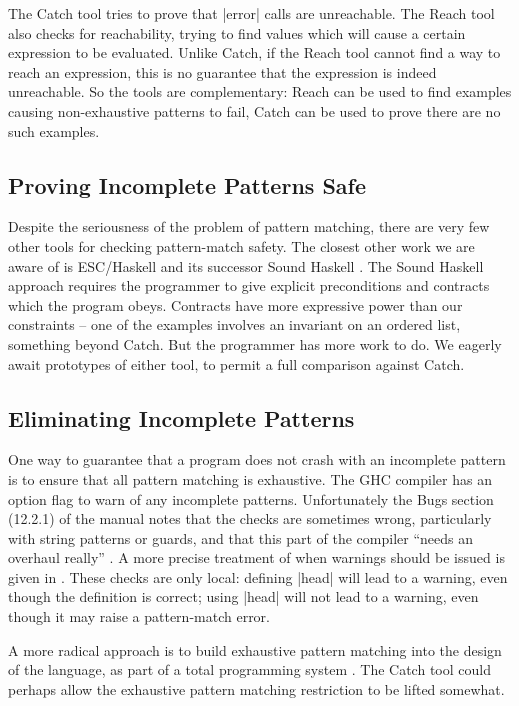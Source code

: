 The Catch tool tries to prove that |error| calls are unreachable. The Reach tool \cite{naylor:reach} also checks for reachability, trying to find values which will cause a certain expression to be evaluated. Unlike Catch, if the Reach tool cannot find a way to reach an expression, this is no guarantee that the expression is indeed unreachable. So the tools are complementary: Reach can be used to find examples causing non-exhaustive patterns to fail, Catch can be used to prove there are no such examples.


\subsection{Proving Incomplete Patterns Safe}

Despite the seriousness of the problem of pattern matching, there are very few other tools for checking pattern-match safety. The closest other work we are aware of is ESC/Haskell \cite{esc_haskell} and its successor Sound Haskell \cite{xu:sound_haskell}. The Sound Haskell approach requires the programmer to give explicit preconditions and contracts which the program obeys. Contracts have more expressive power than our constraints -- one of the examples involves an invariant on an ordered list, something beyond Catch. But the programmer has more work to do. We eagerly await prototypes of either tool, to permit a full comparison against Catch.

\subsection{Eliminating Incomplete Patterns}

One way to guarantee that a program does not crash with an incomplete pattern is to ensure that all pattern matching is exhaustive. The GHC compiler \cite{ghc} has an option flag to warn of any incomplete patterns. Unfortunately the Bugs section (12.2.1) of the manual notes that the checks are sometimes wrong, particularly with string patterns or guards, and that this part of the compiler ``needs an overhaul really'' \cite{ghc}. A more precise treatment of when warnings should be issued is given in \citet{maranget:pattern_warnings}. These checks are only local: defining |head| will lead to a warning, even though the definition is correct; using |head| will not lead to a warning, even though it may raise a pattern-match error.

A more radical approach is to build exhaustive pattern matching into the design of the language, as part of a total programming system \cite{turner:total}. The Catch tool could perhaps allow the exhaustive pattern matching restriction to be lifted somewhat.


